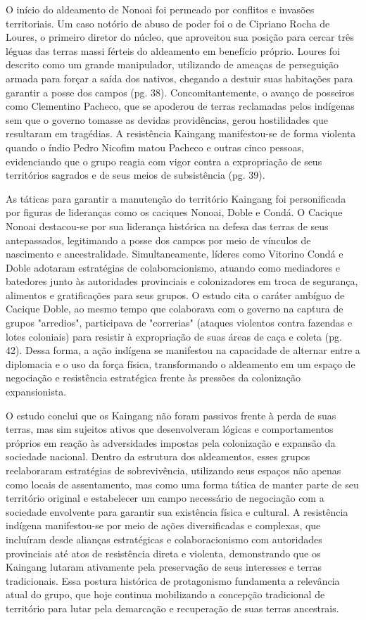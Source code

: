 \documentclass[12pt, a4paper]{article}
\begin{document}
O início do aldeamento de Nonoai foi permeado por conflitos e invasões territoriais. Um caso notório de abuso de poder foi o de Cipriano Rocha de Loures, o primeiro diretor do núcleo, que aproveitou sua posição para cercar três léguas das terras massi férteis do aldeamento em benefício próprio. Loures foi descrito como um grande manipulador, utilizando de ameaças de perseguição armada para forçar a saída dos nativos, chegando a destuir suas habitações para garantir a posse dos campos (pg. 38). Concomitantemente, o avanço de posseiros como Clementino Pacheco, que se apoderou de terras reclamadas pelos indígenas sem que o governo tomasse as devidas providências, gerou hostilidades que resultaram em tragédias. A resistência Kaingang manifestou-se de forma violenta quando o índio Pedro Nicofim matou Pacheco e outras cinco pessoas, evidenciando que o grupo reagia com vigor contra a expropriação de seus territórios sagrados e de seus meios de subsistência (pg. 39).

As táticas para garantir a manutenção do território Kaingang foi personificada por figuras de lideranças como os caciques Nonoai, Doble e Condá. O Cacique Nonoai destacou-se por sua liderança histórica na defesa das terras de seus antepassados, legitimando a posse dos campos por meio de vínculos de nascimento e ancestralidade. Simultaneamente, líderes como Vitorino Condá e Doble adotaram estratégias de colaboracionismo, atuando como mediadores e batedores junto às autoridades provinciais e colonizadores em troca de segurança, alimentos e gratificações para seus grupos. O estudo cita o caráter ambíguo de Cacique Doble, ao mesmo tempo que colaborava com o governo na captura de grupos "arredios", participava de "correrias" (ataques violentos contra fazendas e lotes coloniais) para resistir à expropriação de suas áreas de caça e coleta (pg. 42). Dessa forma, a ação indígena se manifestou na capacidade de alternar entre a diplomacia e o uso da força física, transformando o aldeamento em um espaço de negociação e resistência estratégica frente às pressões da colonização expansionista.

O estudo conclui que os Kaingang não foram passivos frente à perda de suas terras, mas sim sujeitos ativos que desenvolveram lógicas e comportamentos próprios em reação às adversidades impostas pela colonização e expansão da sociedade nacional. Dentro da estrutura dos aldeamentos, esses grupos reelaboraram estratégias de sobrevivência, utilizando seus espaços não apenas como locais de assentamento, mas como uma forma tática de manter parte de seu território original e estabelecer um campo necessário de negociação com a sociedade envolvente para garantir sua existência física e cultural. A resistência indígena manifestou-se por meio de ações diversificadas e complexas, que incluíram desde alianças estratégicas e colaboracionismo com autoridades provinciais até atos de resistência direta e violenta, demonstrando que os Kaingang lutaram ativamente pela preservação de seus interesses e terras tradicionais. Essa postura histórica de protagonismo fundamenta a relevância atual do grupo, que hoje continua mobilizando a concepção tradicional de território para lutar pela demarcação e recuperação de suas terras ancestrais.
\end{document}
